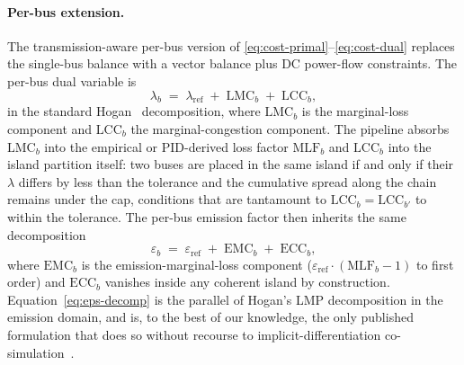 \paragraph{Per-bus extension.}
The transmission-aware per-bus version of
\eqref{eq:cost-primal}--\eqref{eq:cost-dual} replaces the
single-bus balance with a vector balance plus DC power-flow
constraints.  The per-bus dual variable is
\begin{equation}
  \lambda_b
  \;=\; \lambda_{\mathrm{ref}} \;+\; \mathrm{LMC}_b \;+\; \mathrm{LCC}_b,
  \label{eq:lmp-decomp-cited}
\end{equation}
in the standard Hogan~\cite{Hogan1992} decomposition, where
$\mathrm{LMC}_b$ is the marginal-loss component and
$\mathrm{LCC}_b$ the marginal-congestion component.  The
\cenpipe{} pipeline absorbs $\mathrm{LMC}_b$ into the
empirical or PID-derived loss factor $\mathrm{MLF}_b$ and
$\mathrm{LCC}_b$ into the island partition itself: two buses are
placed in the same island if and only if their $\lambda$ differs
by less than the tolerance and the cumulative spread along the
chain remains under the cap, conditions that are tantamount to
$\mathrm{LCC}_b\!=\!\mathrm{LCC}_{b'}$ to within the tolerance.
The per-bus emission factor then inherits the same decomposition
\begin{equation}
  \varepsilon_b \;=\; \varepsilon_{\mathrm{ref}}
                    \;+\; \mathrm{EMC}_b
                    \;+\; \mathrm{ECC}_b,
  \label{eq:eps-decomp}
\end{equation}
where $\mathrm{EMC}_b$ is the emission-marginal-loss component
($\varepsilon_{\mathrm{ref}}\!\cdot\!(\mathrm{MLF}_b\!-\!1)$ to first
order) and $\mathrm{ECC}_b$ vanishes inside any coherent island by
construction.  Equation~\eqref{eq:eps-decomp} is the parallel of
Hogan's LMP decomposition in the emission domain, and is, to the
best of our knowledge, the only published formulation that does so
without recourse to implicit-differentiation
co-simulation~\cite{ValenzuelaASL2022}.
